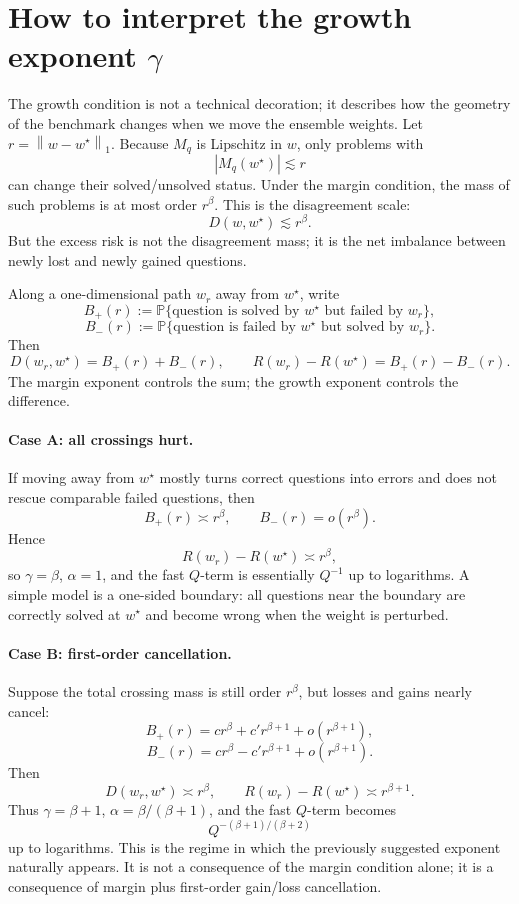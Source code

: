 \documentclass[11pt]{article}
\newcommand{\Pp}{\mathbb P}
\newcommand{\wstar}{w^\star}
\newcommand{\norm}[1]{\left\lVert #1\right\rVert}
\begin{document}
\section{How to interpret the growth exponent $\gamma$}

The growth condition is not a technical decoration; it describes how the geometry of the benchmark changes when we move the ensemble weights.  Let $r=\norm{w-\wstar}_1$.  Because $M_q$ is Lipschitz in $w$, only problems with
\[
|M_q(\wstar)|\lesssim r
\]
can change their solved/unsolved status.  Under the margin condition, the mass of such problems is at most order $r^\beta$.  This is the disagreement scale:
\[
D(w,\wstar)\lesssim r^\beta.
\]
But the excess risk is not the disagreement mass; it is the net imbalance between newly lost and newly gained questions.

Along a one-dimensional path $w_r$ away from $\wstar$, write
\[
B_+(r):=\Pp\{\text{question is solved by }\wstar\text{ but failed by }w_r\},
\]
\[
B_-(r):=\Pp\{\text{question is failed by }\wstar\text{ but solved by }w_r\}.
\]
Then
\[
D(w_r,\wstar)=B_+(r)+B_-(r),
\qquad
R(w_r)-R(\wstar)=B_+(r)-B_-(r).
\]
The margin exponent controls the sum; the growth exponent controls the difference.

\paragraph{Case A: all crossings hurt.}
If moving away from $\wstar$ mostly turns correct questions into errors and does not rescue comparable failed questions, then
\[
B_+(r)\asymp r^\beta,
\qquad
B_-(r)=o(r^\beta).
\]
Hence
\[
R(w_r)-R(\wstar)\asymp r^\beta,
\]
so $\gamma=\beta$, $\alpha=1$, and the fast $Q$-term is essentially $Q^{-1}$ up to logarithms.  A simple model is a one-sided boundary: all questions near the boundary are correctly solved at $\wstar$ and become wrong when the weight is perturbed.

\paragraph{Case B: first-order cancellation.}
Suppose the total crossing mass is still order $r^\beta$, but losses and gains nearly cancel:
\[
B_+(r)=c r^\beta+c' r^{\beta+1}+o(r^{\beta+1}),
\]
\[
B_-(r)=c r^\beta-c' r^{\beta+1}+o(r^{\beta+1}).
\]
Then
\[
D(w_r,\wstar)\asymp r^\beta,
\qquad
R(w_r)-R(\wstar)\asymp r^{\beta+1}.
\]
Thus $\gamma=\beta+1$, $\alpha=\beta/(\beta+1)$, and the fast $Q$-term becomes
\[
Q^{-(\beta+1)/(\beta+2)}
\]
up to logarithms.  This is the regime in which the previously suggested exponent naturally appears.  It is not a consequence of the margin condition alone; it is a consequence of margin plus first-order gain/loss cancellation.
\end{document}
